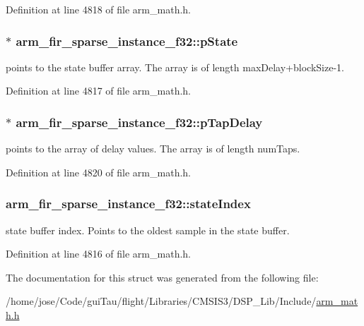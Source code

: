 Definition at line 4818 of file arm\-\_\-math.\-h.

\hypertarget{structarm__fir__sparse__instance__f32_a794af0916666d11cc564d6df08553555}{
\subsubsection[{p\-State}]{$\ast$ arm\-\_\-fir\-\_\-sparse\-\_\-instance\-\_\-f32\-::p\-State}}\label{structarm__fir__sparse__instance__f32_a794af0916666d11cc564d6df08553555}
points to the state buffer array. The array is of length max\-Delay+block\-Size-\/1. 

Definition at line 4817 of file arm\-\_\-math.\-h.

\hypertarget{structarm__fir__sparse__instance__f32_aaa54ae67e5d10c6dd0d697945c638d31}{
\subsubsection[{p\-Tap\-Delay}]{$\ast$ arm\-\_\-fir\-\_\-sparse\-\_\-instance\-\_\-f32\-::p\-Tap\-Delay}}\label{structarm__fir__sparse__instance__f32_aaa54ae67e5d10c6dd0d697945c638d31}
points to the array of delay values. The array is of length num\-Taps. 

Definition at line 4820 of file arm\-\_\-math.\-h.

\hypertarget{structarm__fir__sparse__instance__f32_a57585aeca9dc8686e08df2865375a86d}{
\subsubsection[{state\-Index}]{ arm\-\_\-fir\-\_\-sparse\-\_\-instance\-\_\-f32\-::state\-Index}}\label{structarm__fir__sparse__instance__f32_a57585aeca9dc8686e08df2865375a86d}
state buffer index. Points to the oldest sample in the state buffer. 

Definition at line 4816 of file arm\-\_\-math.\-h.



The documentation for this struct was generated from the following file\-:\begin{DoxyCompactItemize}
\item 
/home/jose/\-Code/gui\-Tau/flight/\-Libraries/\-C\-M\-S\-I\-S3/\-D\-S\-P\-\_\-\-Lib/\-Include/\hyperlink{arm__math_8h}{arm\-\_\-math.\-h}\end{DoxyCompactItemize}
